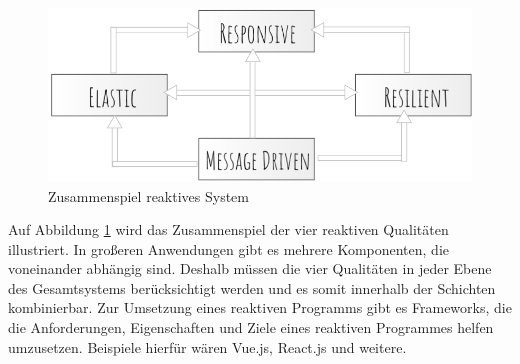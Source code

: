 \begin{figure}[h] 
\centering
\includegraphics[scale=0.5]{fig/reaktiveSystem.png} 
\caption{Zusammenspiel reaktives System}
\label{fig:RS}
\end{figure} 

Auf Abbildung \ref{fig:RS} wird das Zusammenspiel der vier reaktiven Qualit\"aten illustriert.
In gro\ss{}eren Anwendungen gibt es mehrere Komponenten, die voneinander abh\"angig sind. Deshalb m\"ussen die vier Qualit\"aten in jeder Ebene des Gesamtsystems ber\"ucksichtigt werden und es somit innerhalb der Schichten kombinierbar\cite{ReaktiveManifest2014}.
Zur Umsetzung eines reaktiven Programms gibt es Frameworks, die die Anforderungen, Eigenschaften und Ziele eines reaktiven Programmes helfen umzusetzen. Beispiele hierf\"ur w\"aren Vue.js, React.js und weitere.